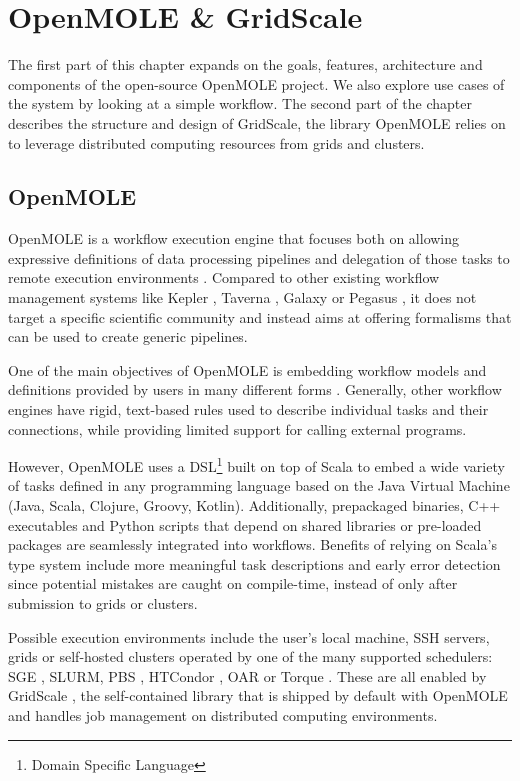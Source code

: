 \chapter{OpenMOLE \& GridScale} \label{DesignChapter}

The first part of this chapter expands on the goals, features, architecture and components of the open-source OpenMOLE project. We also explore use cases of the system by looking at a simple workflow. The second part of the chapter describes the structure and design of GridScale, the library OpenMOLE relies on to leverage distributed computing resources from grids and clusters.

\section{OpenMOLE}

OpenMOLE\cite{OpenMOLE} is a workflow execution engine that focuses both on allowing expressive definitions of data processing pipelines and delegation of those tasks to remote execution environments \cite{Leclaire2016}. Compared to other existing workflow management systems like Kepler \cite{Kepler}, Taverna \cite{Taverna}, Galaxy \cite{Galaxy} or Pegasus \cite{Pegasus}, it does not target a specific scientific community and instead aims at offering formalisms that can be used to create generic pipelines.

One of the main objectives of OpenMOLE is embedding workflow models and definitions provided by users in many different forms \cite{Reuillon2013}. Generally, other workflow engines have rigid, text-based rules used to describe individual tasks and their connections, while providing limited support for calling external programs. 

However, OpenMOLE uses a DSL\footnote{Domain Specific Language} built on top of Scala\cite{Scala} to embed a wide variety of tasks defined in any programming language based on the Java Virtual Machine (Java, Scala, Clojure, Groovy, Kotlin). Additionally, prepackaged binaries, C++ executables and Python scripts that depend on shared libraries or pre-loaded packages are seamlessly integrated into workflows. Benefits of relying on Scala's type system include more meaningful task descriptions and early error detection since potential mistakes are caught on compile-time, instead of only after submission to grids or clusters.

Possible execution environments include the user's local machine, SSH servers, grids or self-hosted clusters operated by one of the many supported schedulers: SGE \cite{SGE}, SLURM, PBS \cite{PBS}, HTCondor \cite{HTCondor}, OAR \cite{OAR} or Torque \cite{Torque}. These are all enabled by GridScale \cite{Reuillon2016}, the self-contained library that is shipped by default with OpenMOLE and handles job management on distributed computing environments.

